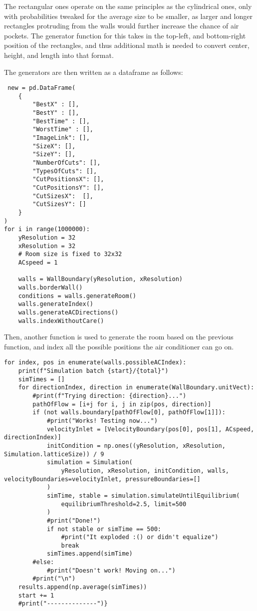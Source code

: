The rectangular ones operate on the same principles as the cylindrical ones, only with probabilities tweaked for the average size to be smaller, as larger and longer rectangles protruding from the walls would further increase the chance of air pockets. The generator function for this takes in the top-left, and bottom-right position of the rectangles, and thus additional math is needed to convert center, height, and length into that format.

The generators are then written as a dataframe as follows:
\begin{verbatim}
 new = pd.DataFrame(
    {
        "BestX" : [],
        "BestY" : [],
        "BestTime" : [],
        "WorstTime" : [],
        "ImageLink": [],
        "SizeX": [],
        "SizeY": [],
        "NumberOfCuts": [],
        "TypesOfCuts": [],
        "CutPositionsX": [],
        "CutPositionsY": [],
        "CutSizesX":  [],
        "CutSizesY": []
    }
)
for i in range(1000000):
    yResolution = 32
    xResolution = 32
	# Room size is fixed to 32x32
    ACspeed = 1

    walls = WallBoundary(yResolution, xResolution)
    walls.borderWall()
    conditions = walls.generateRoom()
    walls.generateIndex()
    walls.generateACDirections()
    walls.indexWithoutCare()   
\end{verbatim}

Then, another function is used to generate the room based on the previous function, and index all the possible positions the air conditioner can go on.
\begin{verbatim}
for index, pos in enumerate(walls.possibleACIndex):
    print(f"Simulation batch {start}/{total}")
    simTimes = []
    for directionIndex, direction in enumerate(WallBoundary.unitVect):
        #print(f"Trying direction: {direction}...")
        pathOfFlow = [i+j for i, j in zip(pos, direction)]
        if (not walls.boundary[pathOfFlow[0], pathOfFlow[1]]):
            #print("Works! Testing now...")
            velocityInlet = [VelocityBoundary(pos[0], pos[1], ACspeed, directionIndex)]
            initCondition = np.ones((yResolution, xResolution, Simulation.latticeSize)) / 9
            simulation = Simulation(
                yResolution, xResolution, initCondition, walls, velocityBoundaries=velocityInlet, pressureBoundaries=[]
            )
            simTime, stable = simulation.simulateUntilEquilibrium(
                equilibriumThreshold=2.5, limit=500
            )
            #print("Done!")
            if not stable or simTime == 500:
                #print("It exploded :() or didn't equalize")
                break
            simTimes.append(simTime)
        #else:
            #print("Doesn't work! Moving on...")
        #print("\n")
    results.append(np.average(simTimes))
    start += 1
    #print("--------------")}
\end{verbatim}

